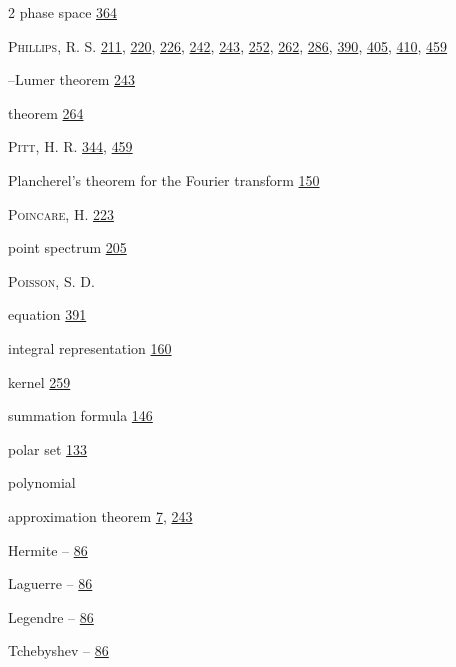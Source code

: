 \begin{multicols}{2}
\noindent phase space \hyperlink{page.364}{364}\par
\noindent \textsc{Phillips}, R. S. \hyperlink{page.211}{211}, \hyperlink{page.220}{220}, \hyperlink{page.226}{226}, \hyperlink{page.242}{242}, \hyperlink{page.243}{243}, \hyperlink{page.252}{252}, \hyperlink{page.262}{262}, \hyperlink{page.286}{286}, \hyperlink{page.390}{390}, \hyperlink{page.405}{405}, \hyperlink{page.410}{410}, \hyperlink{page.459}{459}\par
\hspace*{1.1em}--Lumer theorem \hyperlink{page.243}{243}\par
\hspace*{1.1em}theorem \hyperlink{page.264}{264}\par
\noindent \textsc{Pitt}, H. R. \hyperlink{page.344}{344}, \hyperlink{page.459}{459}\par
\noindent Plancherel's theorem for the Fourier transform \hyperlink{page.150}{150}\par
\noindent \textsc{Poincare}, H. \hyperlink{page.223}{223}\par
\noindent point spectrum \hyperlink{page.205}{205}\par
\noindent \textsc{Poisson}, S. D.\par
\hspace*{1.1em}equation \hyperlink{page.391}{391}\par
\hspace*{1.1em}integral representation \hyperlink{page.160}{160}\par
\hspace*{1.1em}kernel \hyperlink{page.259}{259}\par
\hspace*{1.1em}summation formula \hyperlink{page.146}{146}\par
\noindent polar set \hyperlink{page.133}{133}\par
\noindent polynomial\par
\hspace*{1.1em}approximation theorem \hyperlink{page.7}{7}, \hyperlink{page.243}{243}\par
\hspace*{1.1em}Hermite -- \hyperlink{page.86}{86}\par
\hspace*{1.1em}Laguerre -- \hyperlink{page.86}{86}\par
\hspace*{1.1em}Legendre -- \hyperlink{page.86}{86}\par
\hspace*{1.1em}Tchebyshev -- \hyperlink{page.86}{86}\par

\end{multicols}
